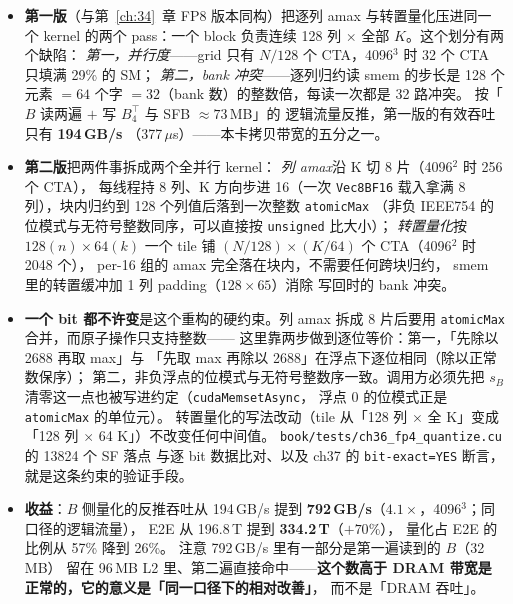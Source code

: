 \begin{itemize}[itemsep=2pt,topsep=3pt]
  \item \textbf{第一版}（与第~\ref{ch:34}~章 FP8 版本同构）把逐列 amax
        与转置量化压进同一个 kernel 的两个 pass：一个 block 负责连续
        128 列 $\times$ 全部 $K$。这个划分有两个缺陷：
        \emph{第一，并行度}——grid 只有 $N/128$ 个 CTA，4096$^3$ 时
        32 个 CTA 只填满 29\% 的 SM；
        \emph{第二，bank 冲突}——逐列归约读 smem 的步长是 128 个元素
        $= 64$ 个字 $= 32$（bank 数）的整数倍，每读一次都是 32 路冲突。
        按「$B$ 读两遍 $+$ 写 $B_4^{\top}$ 与 SFB $\approx73$\,MB」的
        逻辑流量反推，第一版的有效吞吐只有 \textbf{194\,GB/s}
        （377\,$\mu$s）——本卡拷贝带宽的五分之一。
  \item \textbf{第二版}把两件事拆成两个全并行 kernel：
        \emph{列 amax}沿 K 切 8 片（4096$^2$ 时 256 个 CTA），
        每线程持 8 列、K 方向步进 16（一次 \texttt{Vec8BF16} 载入拿满
        8 列），块内归约到 128 个列值后落到一次整数 \texttt{atomicMax}
        （非负 IEEE754 的位模式与无符号整数同序，可以直接按
        \texttt{unsigned} 比大小）；
        \emph{转置量化}按 $128(n)\times64(k)$ 一个 tile 铺
        $(N/128)\times(K/64)$ 个 CTA（4096$^2$ 时 2048 个），
        per-16 组的 amax 完全落在块内，不需要任何跨块归约，
        smem 里的转置缓冲加 1 列 padding（$128{\times}65$）消除
        写回时的 bank 冲突。
  \item \textbf{一个 bit 都不许变}是这个重构的硬约束。列 amax 拆成
        8 片后要用 \texttt{atomicMax} 合并，而原子操作只支持整数——
        这里靠两步做到逐位等价：第一，「先除以 2688 再取 max」与
        「先取 max 再除以 2688」在浮点下逐位相同（除以正常数保序）；
        第二，非负浮点的位模式与无符号整数序一致。调用方必须先把
        $s_B$ 清零这一点也被写进约定（\texttt{cudaMemsetAsync}，
        浮点 $0$ 的位模式正是 \texttt{atomicMax} 的单位元）。
        转置量化的写法改动（tile 从「128 列 $\times$ 全 K」变成
        「128 列 $\times$ 64 K」）不改变任何中间值。
        \texttt{book/\allowbreak tests/\allowbreak ch36\_fp4\_quantize.cu} 的 13824 个 SF 落点
        与逐 bit 数据比对、以及 ch37 的
        \texttt{bit-exact=YES} 断言，就是这条约束的验证手段。
  \item \textbf{收益}：$B$ 侧量化的反推吞吐从 194\,GB/s 提到
        \textbf{792\,GB/s}（$4.1\times$，4096$^3$；同口径的逻辑流量），
        E2E 从 196.8\,T 提到 \textbf{334.2\,T}（$+70\%$），
        量化占 E2E 的比例从 57\% 降到 26\%。
        注意 792\,GB/s 里有一部分是第一遍读到的 $B$（32\,MB）
        留在 96\,MB L2 里、第二遍直接命中——\textbf{这个数高于
        DRAM 带宽是正常的，它的意义是「同一口径下的相对改善」}，
        而不是「DRAM 吞吐」。
\end{itemize}

